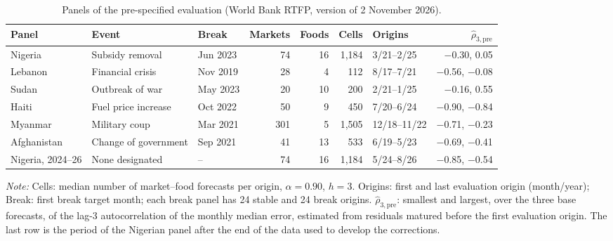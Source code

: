\begin{table}[t]
\caption{Panels of the pre-specified evaluation (World Bank RTFP, version of 2 November 2026).\label{tab:extpanels}}
\centering\footnotesize\setlength{\tabcolsep}{3pt}
\begin{tabular*}{\textwidth}{@{\extracolsep\fill}lllrrrlr@{}}
\toprule
\textbf{Panel} & \textbf{Event} & \textbf{Break} & \textbf{Markets} & \textbf{Foods} & \textbf{Cells} & \textbf{Origins} & \textbf{$\widehat\rho_{3,\mathrm{pre}}$} \\
\midrule
Nigeria & Subsidy removal & Jun 2023 & 74 & 16 & 1,184 & 3/21--2/25 & $-$0.30, 0.05 \\
Lebanon & Financial crisis & Nov 2019 & 28 & 4 & 112 & 8/17--7/21 & $-$0.56, $-$0.08 \\
Sudan & Outbreak of war & May 2023 & 20 & 10 & 200 & 2/21--1/25 & $-$0.16, 0.55 \\
Haiti & Fuel price increase & Oct 2022 & 50 & 9 & 450 & 7/20--6/24 & $-$0.90, $-$0.84 \\
Myanmar & Military coup & Mar 2021 & 301 & 5 & 1,505 & 12/18--11/22 & $-$0.71, $-$0.23 \\
Afghanistan & Change of government & Sep 2021 & 41 & 13 & 533 & 6/19--5/23 & $-$0.69, $-$0.41 \\
Nigeria, 2024--26 & None designated & -- & 74 & 16 & 1,184 & 5/24--8/26 & $-$0.85, $-$0.54 \\
\bottomrule
\end{tabular*}
\begin{tablenotes}
\item \textit{Note:} Cells: median number of market--food forecasts per origin, $\alpha=0.90$, $h=3$. Origins: first and last evaluation origin (month/year); Break: first break target month; each break panel has 24 stable and 24 break origins. $\widehat\rho_{3,\mathrm{pre}}$: smallest and largest, over the three base forecasts, of the lag-3 autocorrelation of the monthly median error, estimated from residuals matured before the first evaluation origin. The last row is the period of the Nigerian panel after the end of the data used to develop the corrections.
\end{tablenotes}
\end{table}
